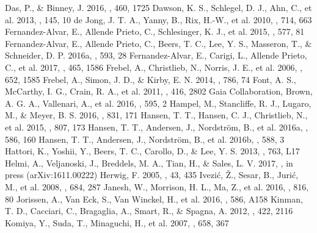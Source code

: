 \documentclass[iop]{emulateapj}
\begin{document}
\begin{thebibliography}{123456789}
 Das, P., \& Binney, J. 2016, \mnras, 460, 1725
 Dawson, K. S., Schlegel, D. J., Ahn, C., et al. 2013, \aj, 145, 10
 de Jong, J. T. A., Yanny, B., Rix, H.-W., et al. 2010, \apj, 714, 663
 Fernandez-Alvar, E., Allende Prieto, C., Schlesinger, K. J., et al. 2015, \aap, 577, 81
 Fernandez-Alvar, E., Allende Prieto, C., Beers, T. C., Lee, Y. S., Masseron, T., \& Schneider, D. P. 2016a, \aap, 593, 28
 Fernandez-Alvar, E., Carigi, L., Allende Prieto, C., et al. 2017, \mnras, 465, 1586
 Frebel, A., Christlieb, N., Norris, J. E., et al. 2006, \apj, 652, 1585
 Frebel, A., Simon, J. D., \& Kirby, E. N. 2014, \apj, 786, 74
 Font, A. S., McCarthy, I. G., Crain, R. A., et al. 2011, \mnras, 416, 2802
 Gaia Collaboration, Brown, A. G. A., Vallenari, A., et al. 2016, \aap, 595, 2
 Hampel, M., Stancliffe, R. J., Lugaro, M., \& Meyer, B. S. 2016, \apj, 831, 171
 Hansen, T. T., Hansen, C. J., Christlieb, N., et al. 2015, \apj, 807, 173
 Hansen, T. T., Andersen, J., Nordstr\"om, B., et al. 2016a, \aap, 586, 160
 Hansen, T. T., Andersen, J., Nordstr\"om, B., et al. 2016b, \aap, 588, 3
 Hattori, K., Yoshii, Y., Beers, T. C., Carollo, D., \& Lee, Y. S. 2013, \apjl, 763, L17
 Helmi, A., Veljanoski, J., Breddels, M. A., Tian, H., \& Sales, L. V. 2017, \aap, in press (arXiv:1611.00222)
 Herwig, F. 2005, \araa, 43, 435
 Ivezi\'c, \v Z., Sesar, B., Juri\'c, M., et al. 2008, \apj, 684, 287
 Janesh, W., Morrison, H. L., Ma, Z., et al. 2016, \apj, 816, 80
 Jorissen, A., Van Eck, S., Van Winckel, H., et al. 2016, \aap, 586, A158
 Kinman, T. D., Cacciari, C., Bragaglia, A., Smart, R., \& Spagna, A. 2012, \mnras, 422, 2116
 Komiya, Y., Suda, T., Minaguchi, H., et al. 2007, \apj, 658, 367

\end{thebibliography}
\end{document}
